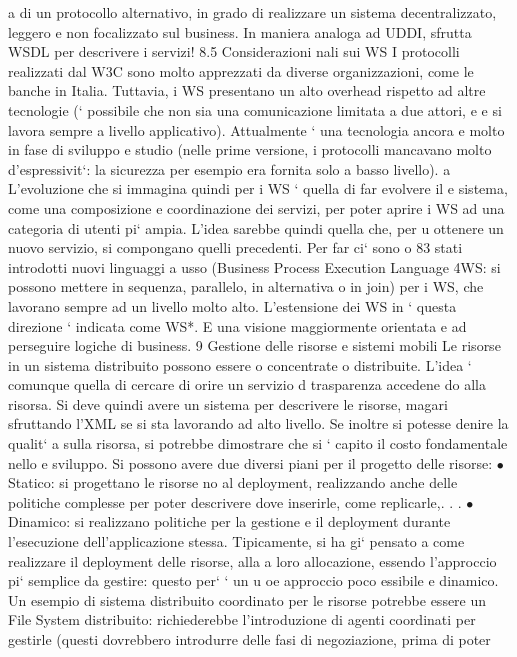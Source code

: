 \documentclass[a4paper,12pt]{article}
\begin{document}
a
di un protocollo alternativo, in grado di realizzare un sistema decentralizzato,
leggero e non focalizzato sul business. In maniera analoga ad UDDI, sfrutta
WSDL per descrivere i servizi!
8.5
Considerazioni nali sui WS
I protocolli realizzati dal W3C sono molto apprezzati da diverse organizzazioni,
come le banche in Italia. Tuttavia, i WS presentano un alto overhead rispetto ad
altre tecnologie (` possibile che non sia una comunicazione limitata a due attori,
e
e si lavora sempre a livello applicativo). Attualmente ` una tecnologia ancora
e
molto in fase di sviluppo e studio (nelle prime versione, i protocolli mancavano
molto d'espressivit`: la sicurezza per esempio era fornita solo a basso livello).
a
L'evoluzione che si immagina quindi per i WS ` quella di far evolvere il
e
sistema, come una composizione e coordinazione dei servizi, per poter aprire i
WS ad una categoria di utenti pi` ampia. L'idea sarebbe quindi quella che, per
u
ottenere un nuovo servizio, si compongano quelli precedenti. Per far ci` sono
o
83
\newpage
stati introdotti nuovi linguaggi a usso (Business Process Execution Language
4WS: si possono mettere in sequenza, parallelo, in alternativa o in join) per
i WS, che lavorano sempre ad un livello molto alto. L'estensione dei WS in
`
questa direzione ` indicata come WS*. E una visione maggiormente orientata
e
ad perseguire logiche di business.
9
Gestione delle risorse e sistemi mobili
Le risorse in un sistema distribuito possono essere o concentrate o distribuite.
L'idea ` comunque quella di cercare di orire un servizio d trasparenza accedene
do alla risorsa.
Si deve quindi avere un sistema per descrivere le risorse, magari sfruttando
l'XML se si sta lavorando ad alto livello. Se inoltre si potesse denire la qualit`
a
sulla risorsa, si potrebbe dimostrare che si ` capito il costo fondamentale nello
e
sviluppo.
Si possono avere due diversi piani per il progetto delle risorse:
$\bullet$ Statico: si progettano le risorse no al deployment, realizzando anche delle
politiche complesse per poter descrivere dove inserirle, come replicarle,. . .
$\bullet$ Dinamico: si realizzano politiche per la gestione e il deployment durante
l'esecuzione dell'applicazione stessa.
Tipicamente, si ha gi` pensato a come realizzare il deployment delle risorse, alla
a
loro allocazione, essendo l'approccio pi` semplice da gestire: questo per` ` un
u
oe
approccio poco essibile e dinamico.
Un esempio di sistema distribuito coordinato per le risorse potrebbe essere
un File System distribuito: richiederebbe l'introduzione di agenti coordinati per
gestirle (questi dovrebbero introdurre delle fasi di negoziazione, prima di poter
\end{document}
